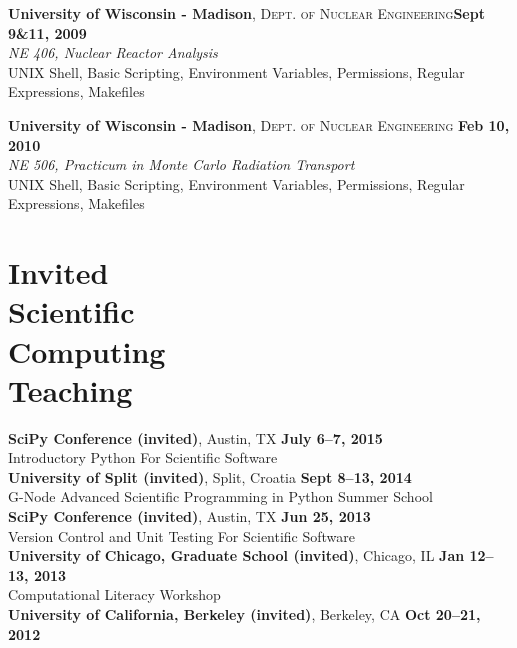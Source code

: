 \documentclass[margin,line]{resume}
\begin{document}
\begin{resume}
    \textbf{University of Wisconsin - Madison}, \textsc{Dept. of Nuclear Engineering}\hfill \textbf{Sept 9\&11, 2009}\\
               \textsl{NE 406, Nuclear Reactor Analysis}\\
               UNIX Shell, Basic Scripting, Environment Variables, Permissions, Regular Expressions, Makefiles

    \textbf{University of Wisconsin - Madison}, \textsc{Dept. of Nuclear
    Engineering} \hfill \textbf{Feb 10, 2010}\\
               \textsl{NE 506, Practicum in Monte Carlo Radiation Transport}\\
               UNIX Shell, Basic Scripting, Environment Variables, Permissions, Regular Expressions, Makefiles

    \section{\mysidestyle Invited\\Scientific\\Computing\\Teaching}
    \textbf{SciPy Conference (invited)}, Austin, TX \hfill \textbf{July 6--7, 2015}\\
    Introductory Python For Scientific Software
               \vspace{2mm}\\
    \textbf{University of Split (invited)}, Split, Croatia \hfill \textbf{Sept 8--13, 2014}\\
    G-Node Advanced Scientific Programming in Python Summer School
               \vspace{2mm}\\
    \textbf{SciPy Conference (invited)}, Austin, TX \hfill \textbf{Jun 25, 2013}\\
    Version Control and Unit Testing For Scientific Software
               \vspace{2mm}\\
    \textbf{University of Chicago, Graduate School (invited)}, Chicago, IL \hfill \textbf{Jan 12--13, 2013}\\
    Computational Literacy Workshop
               \vspace{2mm}\\
    \textbf{University of California, Berkeley (invited)}, Berkeley, CA \hfill \textbf{Oct 20--21, 2012}\\

\end{resume}
\end{document}
